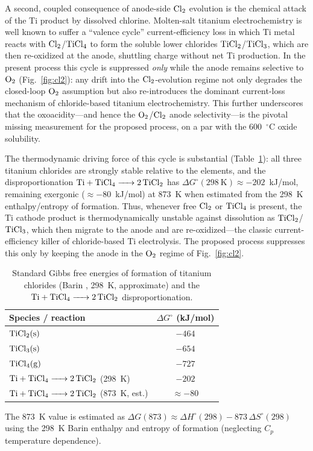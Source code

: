 \documentclass[sn-mathphys,Numbered]{sn-jnl}
\begin{document}
A second, coupled consequence of anode-side $\ce{Cl2}$ evolution is the chemical attack of the Ti product by dissolved chlorine. Molten-salt titanium electrochemistry is well known to suffer a ``valence cycle'' current-efficiency loss in which Ti metal reacts with $\ce{Cl2}$/$\ce{TiCl4}$ to form the soluble lower chlorides $\ce{TiCl2}$/$\ce{TiCl3}$, which are then re-oxidized at the anode, shuttling charge without net Ti production. In the present process this cycle is suppressed \emph{only} while the anode remains selective to $\ce{O2}$ (Fig.~\ref{fig:cl2}): any drift into the $\ce{Cl2}$-evolution regime not only degrades the closed-loop $\ce{O2}$ assumption but also re-introduces the dominant current-loss mechanism of chloride-based titanium electrochemistry. This further underscores that the oxoacidity---and hence the $\ce{O2}$/$\ce{Cl2}$ anode selectivity---is the pivotal missing measurement for the proposed process, on a par with the 600~$^{\circ}$C oxide solubility.

The thermodynamic driving force of this cycle is substantial (Table~\ref{tab:ticl}): all three titanium chlorides are strongly stable relative to the elements, and the disproportionation $\ce{Ti + TiCl4 -> 2TiCl2}$ has $\Delta G^{\circ}(298~\mathrm{K}) \approx -202$~kJ/mol, remaining exergonic ($\approx -80$~kJ/mol) at 873~K when estimated from the 298~K enthalpy/entropy of formation. Thus, whenever free $\ce{Cl2}$ or $\ce{TiCl4}$ is present, the Ti cathode product is thermodynamically unstable against dissolution as $\ce{TiCl2}$/$\ce{TiCl3}$, which then migrate to the anode and are re-oxidized---the classic current-efficiency killer of chloride-based Ti electrolysis. The proposed process suppresses this only by keeping the anode in the $\ce{O2}$ regime of Fig.~\ref{fig:cl2}.

\begin{table}[!ht]
\centering
\footnotesize
\caption{Standard Gibbs free energies of formation of titanium chlorides (Barin \cite{barin1995}, 298~K, approximate) and the $\ce{Ti + TiCl4 -> 2TiCl2}$ disproportionation.}
\label{tab:ticl}
\begin{tabular}{lc}
\toprule
Species / reaction & $\Delta G^{\circ}$ (kJ/mol) \\
\midrule
$\ce{TiCl2(s)}$ & $-464$ \\
$\ce{TiCl3(s)}$ & $-654$ \\
$\ce{TiCl4(g)}$ & $-727$ \\
$\ce{Ti + TiCl4 -> 2TiCl2}$ (298~K) & $-202$ \\
$\ce{Ti + TiCl4 -> 2TiCl2}$ (873~K, est.) & $\approx -80$ \\
\bottomrule
\end{tabular}

\par\footnotesize The 873~K value is estimated as $\Delta G(873) \approx \Delta H^{\circ}(298) - 873\,\Delta S^{\circ}(298)$ using the 298~K Barin enthalpy and entropy of formation (neglecting $C_p$ temperature dependence).
\end{table}
\end{document}

